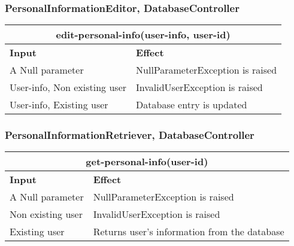 \subsubsection{PersonalInformationEditor, DatabaseController}
\begin{tabular}{|p{5cm}|p{7cm}|}
\hline
\multicolumn{2}{|c|}{edit-personal-info(user-info, user-id)} \\
\hline
\textbf{Input} & \textbf{Effect} \\

\hline
A Null parameter & NullParameterException is raised \\

\hline
User-info, Non existing user & InvalidUserException is raised \\

\hline
User-info, Existing user & Database entry is updated \\
\hline
\end{tabular}
\subsubsection{PersonalInformationRetriever, DatabaseController}
\begin{tabular}{|p{5cm}|p{7cm}|}
\hline
\multicolumn{2}{|c|}{get-personal-info(user-id)} \\
\hline
\textbf{Input} & \textbf{Effect} \\

\hline
A Null parameter & NullParameterException is raised \\

\hline
Non existing user & InvalidUserException is raised \\

\hline
Existing user & Returns user's information from the database \\
\hline
\end{tabular}
